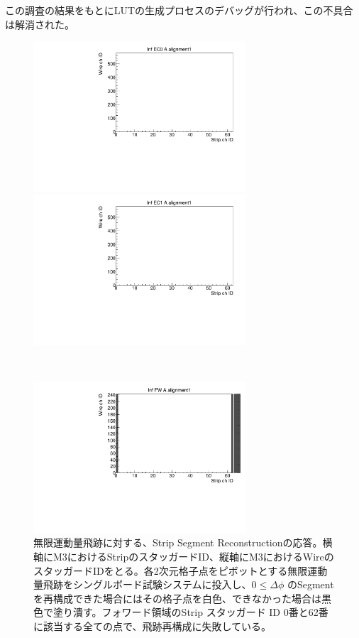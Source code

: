 この調査の結果をもとにLUTの生成プロセスのデバッグが行われ、この不具合は解消された。
\begin{figure}
    \begin{minipage}[b]{.5\linewidth}
        \centering
        \includegraphics[height=5.6cm]{fig/Test/B_InfEC0_strip.pdf}
    \end{minipage}
    \begin{minipage}[b]{.5\linewidth}
        \centering
        \includegraphics[height=5.6cm]{fig/Test/B_InfEC1_strip.pdf}
    \end{minipage}\\
    \begin{minipage}[b]{\linewidth}
        \centering
        \includegraphics[height=5.6cm]{fig/Test/B_InfFW_strip.pdf}
    \end{minipage}
    \caption[無限運動量飛跡に対する、Strip Segment Reconstructionの応答]{無限運動量飛跡に対する、Strip Segment Reconstructionの応答。横軸にM3におけるStripのスタッガードID、縦軸にM3におけるWireのスタッガードIDをとる。各2次元格子点をピボットとする無限運動量飛跡をシングルボード試験システムに投入し、$0 \leq \Delta\phi$ のSegmentを再構成できた場合にはその格子点を白色、できなかった場合は黒色で塗り潰す。フォワード領域のStrip スタッガード ID 0番と62番に該当する全ての点で、飛跡再構成に失敗している。}
    \label{Inf_B_Strip}
\end{figure}


